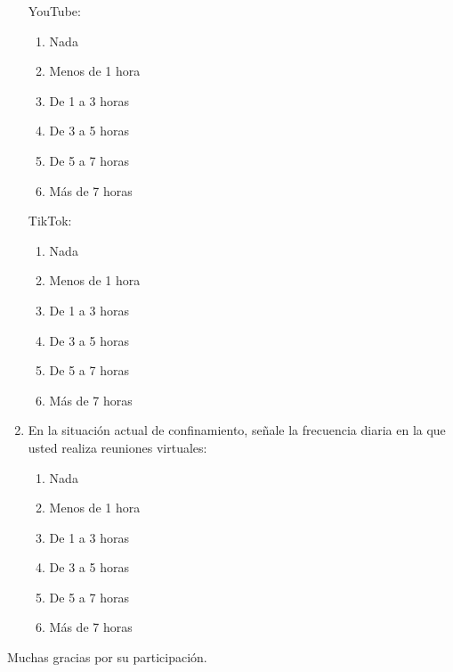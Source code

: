 \documentclass[spanish]{textolivre}
\begin{document}
\begin{enumerate}
    YouTube:
    \begin{enumerate}
        \item Nada
        \item Menos de 1 hora
        \item De 1 a 3 horas
        \item De 3 a 5 horas
        \item De 5 a 7 horas
        \item Más de 7 horas
    \end{enumerate}
    
    TikTok:
    \begin{enumerate}
        \item Nada
        \item Menos de 1 hora
        \item De 1 a 3 horas
        \item De 3 a 5 horas
        \item De 5 a 7 horas
        \item Más de 7 horas
    \end{enumerate}
    \item En la situación actual de confinamiento, señale la frecuencia diaria en la que usted realiza reuniones virtuales:
    \begin{enumerate}
        \item Nada
        \item Menos de 1 hora
        \item De 1 a 3 horas
        \item De 3 a 5 horas
        \item De 5 a 7 horas
        \item Más de 7 horas
    \end{enumerate}
\end{enumerate}

Muchas gracias por su participación.
\end{document}
